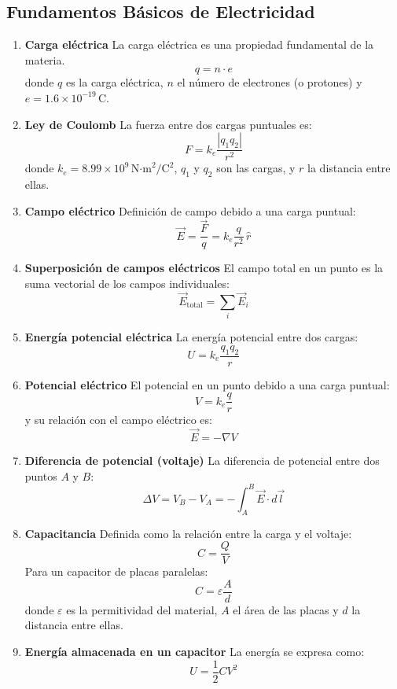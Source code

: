 \begin{multicols}{2}
  \section*{Fundamentos Básicos de Electricidad}

\begin{enumerate}
    \item \textbf{Carga eléctrica}  
    La carga eléctrica es una propiedad fundamental de la materia.  
    \[
        q = n \cdot e
    \]  
    donde \( q \) es la carga eléctrica, \( n \) el número de electrones (o protones) y \( e = 1.6 \times 10^{-19}\,\text{C} \).

    \item \textbf{Ley de Coulomb}  
    La fuerza entre dos cargas puntuales es:  
    \[
        F = k_e \frac{|q_1 q_2|}{r^2}
    \]  
    donde \( k_e = 8.99 \times 10^9 \,\text{N·m}^2/\text{C}^2 \), \( q_1 \) y \( q_2 \) son las cargas, y \( r \) la distancia entre ellas.

    \item \textbf{Campo eléctrico}  
    Definición de campo debido a una carga puntual:  
    \[
        \vec{E} = \frac{\vec{F}}{q} = k_e \frac{q}{r^2} \,\hat{r}
    \]  

    \item \textbf{Superposición de campos eléctricos}  
    El campo total en un punto es la suma vectorial de los campos individuales:  
    \[
        \vec{E}_{\text{total}} = \sum_i \vec{E}_i
    \]

    \item \textbf{Energía potencial eléctrica}  
    La energía potencial entre dos cargas:  
    \[
        U = k_e \frac{q_1 q_2}{r}
    \]  

    \item \textbf{Potencial eléctrico}  
    El potencial en un punto debido a una carga puntual:  
    \[
        V = k_e \frac{q}{r}
    \]  
    y su relación con el campo eléctrico es:  
    \[
        \vec{E} = - \nabla V
    \]

    \item \textbf{Diferencia de potencial (voltaje)}  
    La diferencia de potencial entre dos puntos \(A\) y \(B\):  
    \[
        \Delta V = V_B - V_A = - \int_A^B \vec{E} \cdot d\vec{l}
    \]

    \item \textbf{Capacitancia}  
    Definida como la relación entre la carga y el voltaje:  
    \[
        C = \frac{Q}{V}
    \]  
    Para un capacitor de placas paralelas:  
    \[
        C = \varepsilon \frac{A}{d}
    \]  
    donde \( \varepsilon \) es la permitividad del material, \( A \) el área de las placas y \( d \) la distancia entre ellas.

    \item \textbf{Energía almacenada en un capacitor}  
    La energía se expresa como:  
    \[
        U = \frac{1}{2} C V^2
    \]
\end{enumerate}
\end{multicols}
\newpage

